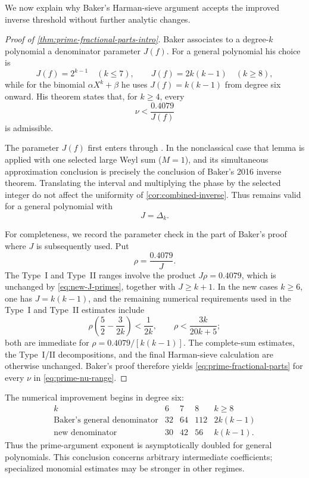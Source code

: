 \documentclass[11pt,reqno]{amsart}
\numberwithin{equation}{section}
\theoremstyle{definition}
\theoremstyle{remark}
\begin{document}
We now explain why Baker's Harman-sieve argument \cite{BakerPrimes2017} accepts the improved inverse threshold without further analytic changes.

\begin{proof}[Proof of \cref{thm:prime-fractional-parts-intro}]
Baker associates to a degree-$k$ polynomial a denominator parameter $J(f)$.  For a general polynomial his choice is
\[
  J(f)=2^{k-1}\quad(k\le7),
  \qquad
  J(f)=2k(k-1)\quad(k\ge8),
\]
while for the binomial $\alpha X^k+\beta$ he uses $J(f)=k(k-1)$ from degree six onward.  His theorem states that, for $k\ge4$, every
\[
  \nu<\frac{0.4079}{J(f)}
\]
is admissible.

The parameter $J(f)$ first enters through \cite[Lemma~5]{BakerPrimes2017}.  In the nonclassical case that lemma is applied with one selected large Weyl sum ($M=1$), and its simultaneous approximation conclusion is precisely the conclusion of Baker's 2016 inverse theorem.  Translating the interval and multiplying the phase by the selected integer do not affect the uniformity of \cref{cor:combined-inverse}.  Thus \cite[Lemma~5]{BakerPrimes2017} remains valid for a general polynomial with
\begin{equation}\label{eq:new-J-primes}
  J=\Delta_k.
\end{equation}

For completeness, we record the parameter check in the part of Baker's proof where $J$ is subsequently used.  Put
\[
  \rho=\frac{0.4079}{J}.
\]
The Type~I and Type~II ranges involve the product $J\rho=0.4079$, which is unchanged by \eqref{eq:new-J-primes}, together with $J\ge k+1$.  In the new cases $k\ge6$, one has $J=k(k-1)$, and the remaining numerical requirements used in the Type~I and Type~II estimates include
\[
  \rho\left(\frac52-\frac{3}{2k}\right)<\frac1{2k},
  \qquad
  \rho<\frac{3k}{20k+5};
\]
both are immediate for $\rho=0.4079/[k(k-1)]$.  The complete-sum estimates, the Type~I/II decompositions, and the final Harman-sieve calculation are otherwise unchanged.  Baker's proof therefore yields \eqref{eq:prime-fractional-parts} for every $\nu$ in \eqref{eq:prime-nu-range}.
\end{proof}

The numerical improvement begins in degree six:
\[
\begin{array}{c|ccc|c}
  k&6&7&8&k\ge8\\ \hline
  \text{Baker's general denominator}&32&64&112&2k(k-1)\\
  \text{new denominator}&30&42&56&k(k-1).
\end{array}
\]
Thus the prime-argument exponent is asymptotically doubled for general polynomials.  This conclusion concerns arbitrary intermediate coefficients; specialized monomial estimates may be stronger in other regimes.
\end{document}
